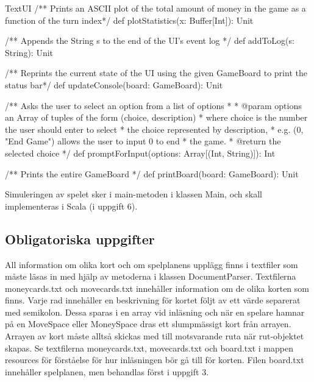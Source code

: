 \begin{ScalaSpec}{TextUI}
   /** Prints an ASCII plot of the total amount 
	of money in the game as a function of the turn index*/
  def plotStatistics(x: Buffer[Int]): Unit

  /** Appends the String s to the end of the UI's event log */
  def addToLog(s: String): Unit 

  /** Reprints the current state of the UI using the given
	GameBoard to print the status bar*/
  def updateConsole(board: GameBoard): Unit 

 
  /** Asks the user to select an option from a list of options
    *
    * @param options an Array of tuples of the form (choice, description)
    *                where choice is the number the user should enter to select 
    *                the choice represented by description,
    *                e.g. (0,  "End Game") allows the user to input 0 to end 
    *                the game.
    * @return        the selected choice
    */
  def promptForInput(options: Array[(Int, String)]): Int 

  /** Prints the entire GameBoard */
  def printBoard(board: GameBoard): Unit 

 
\end{ScalaSpec}

Simuleringen av spelet sker i main-metoden i klassen Main, och skall implementeras i Scala (i uppgift 6).


\subsection{Obligatoriska uppgifter}

\Task All information om olika kort och om spelplanens upplägg finns i textfiler som måste läsas in med hjälp av metoderna i klassen DocumentParser. 
Textfilerna moneycards.txt och movecards.txt innehåller information om de olika korten som finns.
Varje rad innehåller en beskrivning för kortet följt av ett värde separerat med semikolon. Dessa sparas i en array vid inläsning och när en spelare hamnar på en MoveSpace eller MoneySpace dras ett slumpmässigt kort från arrayen. 
Arrayen av kort måste alltså skickas med till motsvarande ruta när rut-objektet skapas.
Se textfilerna moneycards.txt, movecards.txt och board.txt i mappen resources för förståelse för hur inläsningen bör gå till för korten.
Filen board.txt innehåller spelplanen, men behandlas först i uppgift 3.



